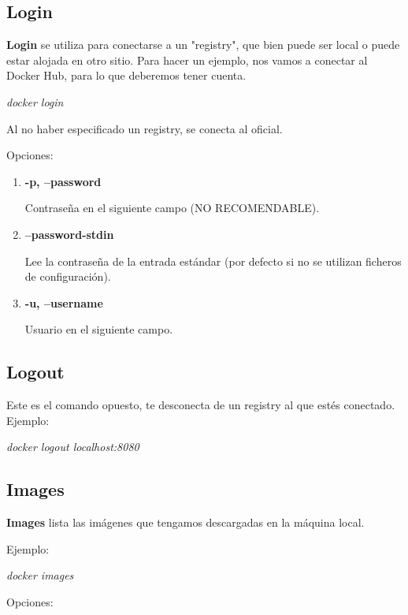 \documentclass[]{article}
\begin{document}
\subsection{Login}
\textbf{Login} se utiliza para conectarse a un "registry", que bien puede ser local o puede estar alojada en otro sitio.
Para hacer un ejemplo, nos vamos a conectar al Docker Hub, para lo que deberemos tener cuenta.
\begin{center}
	\it
	docker login
\end{center}
Al no haber especificado un registry, se conecta al oficial.

Opciones:

\begin{enumerate}
\renewcommand{\labelenumi}{$\bullet$}
\item {\bf -p, --password}

Contraseña en el siguiente campo (NO RECOMENDABLE).
\item {\bf --password-stdin}

Lee la contraseña de la entrada estándar (por defecto si no se utilizan ficheros de configuración).
\item {\bf -u, --username}

Usuario en el siguiente campo.

\end{enumerate}


\subsection{Logout}
Este es el comando opuesto, te desconecta de un registry al que estés conectado.
Ejemplo:
\begin{center}
	\it
	docker logout localhost:8080
\end{center}

\subsection{Images}
\textbf{Images} lista las imágenes que tengamos descargadas en la máquina local.

Ejemplo:

\begin{center}
	\it
	docker images
\end{center}

Opciones:
\end{document}
